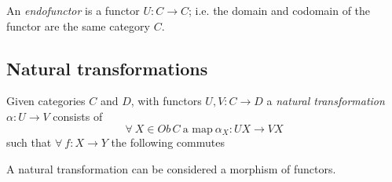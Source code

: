\begin{definition}
    An \textit{endofunctor} is a functor $U : C \rightarrow C$;
    i.e. the domain and codomain of the functor are the same category $C$.
\end{definition}

\subsection{Natural transformations}
\begin{definition}
    Given categories $C$ and $D$,
    with functors $U, V : C \rightarrow D$
    a \textit{natural transformation} $\alpha : U \rightarrow V$
    consists of
    \begin{equation}
        \forall\ X \in Ob\,C\ \textrm{a map} \ \alpha_X : UX \rightarrow VX
    \end{equation}
    such that $\forall\ f : X \rightarrow Y$ the following commutes
    \begin{center}
    \end{center}
    A natural transformation can be considered a morphism of functors.
\end{definition}

